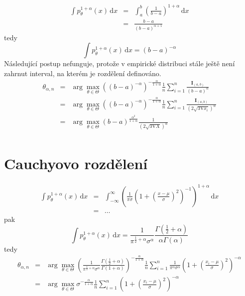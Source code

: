 \documentclass[11pt, a4paper]{article}
\newcommand{\intpa}{\int p_\theta^{1+\alpha}(x) \, \mathrm{d}x }
\newcommand{\amtiT}{\arg \max_{\theta \in \Theta}}
\begin{document}
\begin{eqnarray}
\intpa & = & \int_{a }^{b } \left( \frac{1}{b-a} \right) ^{1 + \alpha} \, \mathrm{d}x \nonumber\\
& = & \frac{b-a}{(b-a)^{\alpha+1}} \nonumber
\end{eqnarray} 
tedy
\begin{equation}
\intpa = (b-a)^{-\alpha}
\end{equation}
Následující postup nefunguje, protože v empirické distribuci stále ještě není zahrnut interval, na kterém je rozdělení definováno. 
\begin{eqnarray}
	\theta_{\alpha,n} & = & \amtiT \left( (b-a)^{-\alpha} \right)^{-\frac{\alpha}{1+\alpha}} \frac{1}{n} \sum_{i=1}^n \frac{\mathbf{I}_{(a,b)}}{(b-a)^\alpha} \nonumber\\
	& = & \amtiT \left( (b-a)^{-\alpha} \right)^{-\frac{\alpha}{1+\alpha}} \frac{1}{n} \sum_{i=1}^n \frac{\mathbf{I}_{(a,b)}}{\left(2\sqrt{3\mathrm{V}x_i}\right)^\alpha} \nonumber\\
	& = & \amtiT (b-a)^{\frac{\alpha^2}{1+\alpha}}\frac{1}{\left(2\sqrt{3\mathrm{V}X}\right)^\alpha}	\nonumber\\
\end{eqnarray}


\section{Cauchyovo rozdělení}

\begin{eqnarray}
\intpa & = & \int_{-\infty }^{\infty } \left( \frac{1}{\pi \sigma} \left( 1 + \left( \frac{x - \mu}{\sigma} \right) ^2 \right)^{-1} \right)^{1+\alpha} \, \mathrm{d}x \nonumber\\
& = & \ldots \nonumber
\end{eqnarray} 
pak
\begin{equation}
\intpa = \frac{1}{\pi^{\frac{1}{2}+\alpha}\sigma^\alpha} \frac{\Gamma(\frac{1}{2} + \alpha)}{\alpha\Gamma(\alpha)}
\end{equation}
tedy
\begin{eqnarray}
	\theta_{\alpha,n} & = & \amtiT \left( \frac{1}{\pi^{\frac{1}{2}+\alpha}\sigma^\alpha} \frac{\Gamma(\frac{1}{2} + \alpha)}{\Gamma(1+\alpha)} \right)^{-\frac{\alpha}{1+\alpha}} 
	\frac{1}{n} \sum_{i=1}^n \frac{1}{\pi^\alpha\sigma^\alpha}\left( 1 + \left( \frac{x_i-\mu}{\sigma} \right)^2 \right)^{-\alpha} \nonumber \\
	& = & \amtiT \sigma^{-\frac{\alpha}{1+\alpha}} \frac{1}{n} \sum_{i=1}^n \left( 1 + \left( \frac{x_i-\mu}{\sigma} \right)^2 \right)^{-\alpha} \nonumber
\end{eqnarray}
\end{document}
